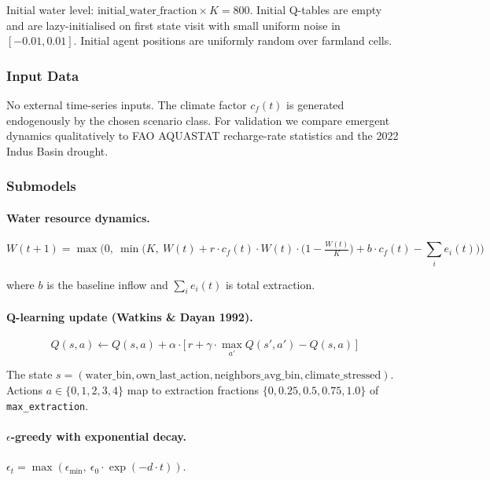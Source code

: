 \documentclass[12pt, a4paper]{article}
\begin{document}
Initial water level: $\text{initial\_water\_fraction} \times K = 800$. Initial
Q-tables are empty and are lazy-initialised on first state visit with small
uniform noise in $[-0.01, 0.01]$. Initial agent positions are uniformly random
over farmland cells.

\subsubsection{Input Data}

No external time-series inputs. The climate factor $c_f(t)$ is generated
endogenously by the chosen scenario class. For validation we compare emergent
dynamics qualitatively to FAO AQUASTAT recharge-rate statistics and the
2022 Indus Basin drought.

\subsubsection{Submodels}

\paragraph{Water resource dynamics.}
\begin{equation*}
W(t{+}1) = \max\!\Big(0,\ \min\!\big(K,\ W(t) + r \cdot c_f(t) \cdot W(t) \cdot \big(1 - \tfrac{W(t)}{K}\big) + b \cdot c_f(t) - \sum_i e_i(t)\big)\Big)
\end{equation*}

where $b$ is the baseline inflow and $\sum_i e_i(t)$ is total extraction.

\paragraph{Q-learning update (Watkins \& Dayan 1992).}
\begin{equation*}
Q(s, a) \leftarrow Q(s, a) + \alpha \cdot \big[\, r + \gamma \cdot \max_{a'} Q(s', a') - Q(s, a) \,\big]
\end{equation*}

The state $s = (\text{water\_bin}, \text{own\_last\_action}, \text{neighbors\_avg\_bin}, \text{climate\_stressed})$.
Actions $a \in \{0, 1, 2, 3, 4\}$ map to extraction fractions
$\{0, 0.25, 0.5, 0.75, 1.0\}$ of \texttt{max\_extraction}.

\paragraph{$\epsilon$-greedy with exponential decay.}
$\epsilon_t = \max(\epsilon_{\min},\ \epsilon_0 \cdot \exp(-d \cdot t))$.
\end{document}

